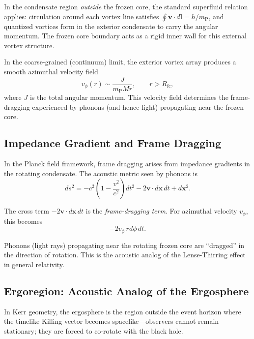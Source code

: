 \documentclass[12pt,a4paper]{article}
\newcommand{\planckmass}{m_\text{P}}
\theoremstyle{definition}
\begin{document}
In the condensate region \emph{outside} the frozen core, the standard superfluid relation applies: circulation around each vortex line satisfies $\oint \mathbf{v} \cdot d\mathbf{l} = h/\planckmass$, and quantized vortices form in the exterior condensate to carry the angular momentum. The frozen core boundary acts as a rigid inner wall for this external vortex structure.

In the coarse-grained (continuum) limit, the exterior vortex array produces a smooth azimuthal velocity field
\begin{equation}
v_\phi(r) \sim \frac{J}{\planckmass M r}, \qquad r > R_\text{fc},
\label{eq:v_phi}
\end{equation}
where $J$ is the total angular momentum. This velocity field determines the frame-dragging experienced by phonons (and hence light) propagating near the frozen core.

\subsection{Impedance Gradient and Frame Dragging}
\label{subsec:impedance_frame_dragging}

In the Planck field framework, frame dragging arises from impedance gradients in the rotating condensate. The acoustic metric seen by phonons is \cite{HulseTaylorBinary2025}
\begin{equation}
ds^2 = -c^2 \left(1 - \frac{v^2}{c^2}\right) dt^2 - 2 \mathbf{v} \cdot d\mathbf{x} \, dt + d\mathbf{x}^2.
\label{eq:acoustic_metric}
\end{equation}

The cross term $-2 \mathbf{v} \cdot d\mathbf{x} \, dt$ is the \emph{frame-dragging term}. For azimuthal velocity $v_\phi$, this becomes
\begin{equation}
-2 v_\phi \, r d\phi \, dt.
\label{eq:frame_dragging_term}
\end{equation}

Phonons (light rays) propagating near the rotating frozen core are ``dragged'' in the direction of rotation. This is the acoustic analog of the Lense-Thirring effect in general relativity.

\subsection{Ergoregion: Acoustic Analog of the Ergosphere}
\label{subsec:ergoregion}

In Kerr geometry, the ergosphere is the region outside the event horizon where the timelike Killing vector becomes spacelike—observers cannot remain stationary; they are forced to co-rotate with the black hole.
\end{document}
